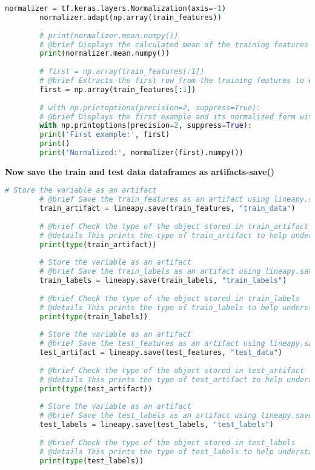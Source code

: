 \begin{lstlisting}[language=Python]
		normalizer = tf.keras.layers.Normalization(axis=-1)
		normalizer.adapt(np.array(train_features))
		
		# print(normalizer.mean.numpy())
		# @brief Displays the calculated mean of the training features after normalization.
		print(normalizer.mean.numpy())
		
		# first = np.array(train_features[:1])
		# @brief Extracts the first row from the training features to examine how it is normalized.
		first = np.array(train_features[:1])
		
		# with np.printoptions(precision=2, suppress=True):
		# @brief Displays the first example and its normalized form with a specified precision.
		with np.printoptions(precision=2, suppress=True):
		print('First example:', first)
		print()
		print('Normalized:', normalizer(first).numpy())
	\end{lstlisting}
	
	\pagebreak
	\textbf{Now save the train and test data dataframes as artifacts-save()}
	
	\begin{lstlisting}[language=Python]
		# Store the variable as an artifact
		# @brief Save the train_features as an artifact using lineapy.save() and store the result in train_artifact
		train_artifact = lineapy.save(train_features, "train_data")
		
		# @brief Check the type of the object stored in train_artifact
		# @details This prints the type of train_artifact to help understand its data structure.
		print(type(train_artifact))
		
		# Store the variable as an artifact
		# @brief Save the train_labels as an artifact using lineapy.save() and store the result in train_labels
		train_labels = lineapy.save(train_labels, "train_labels")
		
		# @brief Check the type of the object stored in train_labels
		# @details This prints the type of train_labels to help understand its data structure.
		print(type(train_labels))
		
		# Store the variable as an artifact
		# @brief Save the test_features as an artifact using lineapy.save() and store the result in test_artifact
		test_artifact = lineapy.save(test_features, "test_data")
		
		# @brief Check the type of the object stored in test_artifact
		# @details This prints the type of test_artifact to help understand its data structure.
		print(type(test_artifact))
		
		# Store the variable as an artifact
		# @brief Save the test_labels as an artifact using lineapy.save() and store the result in test_labels
		test_labels = lineapy.save(test_labels, "test_labels")
		
		# @brief Check the type of the object stored in test_labels
		# @details This prints the type of test_labels to help understand its data structure.
		print(type(test_labels))
	\end{lstlisting}
	
